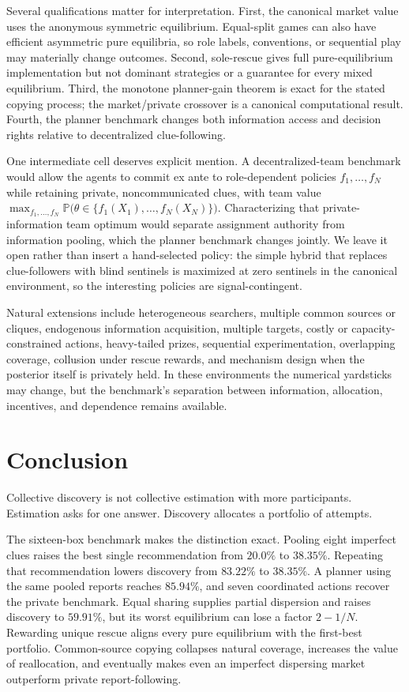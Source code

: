 \documentclass[11pt]{article}
\theoremstyle{definition}
\theoremstyle{remark}
\newcommand{\Prob}{\mathbb{P}}
\newcommand{\1}{\mathbf{1}}
\begin{document}
Several qualifications matter for interpretation. First, the canonical market value uses the anonymous symmetric equilibrium. Equal-split games can also have efficient asymmetric pure equilibria, so role labels, conventions, or sequential play may materially change outcomes. Second, sole-rescue gives full pure-equilibrium implementation but not dominant strategies or a guarantee for every mixed equilibrium. Third, the monotone planner-gain theorem is exact for the stated copying process; the market/private crossover is a canonical computational result. Fourth, the planner benchmark changes both information access and decision rights relative to decentralized clue-following.

One intermediate cell deserves explicit mention. A decentralized-team benchmark would allow the agents to commit ex ante to role-dependent policies $f_1,\ldots,f_N$ while retaining private, noncommunicated clues, with team value $\max_{f_1,\ldots,f_N}\Prob\bigl(\theta\in\{f_1(X_1),\ldots,f_N(X_N)\}\bigr)$. Characterizing that private-information team optimum would separate assignment authority from information pooling, which the planner benchmark changes jointly. We leave it open rather than insert a hand-selected policy: the simple hybrid that replaces clue-followers with blind sentinels is maximized at zero sentinels in the canonical environment, so the interesting policies are signal-contingent.

Natural extensions include heterogeneous searchers, multiple common sources or cliques, endogenous information acquisition, multiple targets, costly or capacity-constrained actions, heavy-tailed prizes, sequential experimentation, overlapping coverage, collusion under rescue rewards, and mechanism design when the posterior itself is privately held. In these environments the numerical yardsticks may change, but the benchmark's separation between information, allocation, incentives, and dependence remains available.

\section{Conclusion}

Collective discovery is not collective estimation with more participants. Estimation asks for one answer. Discovery allocates a portfolio of attempts.

The sixteen-box benchmark makes the distinction exact. Pooling eight imperfect clues raises the best single recommendation from $20.0\%$ to $38.35\%$. Repeating that recommendation lowers discovery from $83.22\%$ to $38.35\%$. A planner using the same pooled reports reaches $85.94\%$, and seven coordinated actions recover the private benchmark. Equal sharing supplies partial dispersion and raises discovery to $59.91\%$, but its worst equilibrium can lose a factor $2-1/N$. Rewarding unique rescue aligns every pure equilibrium with the first-best portfolio. Common-source copying collapses natural coverage, increases the value of reallocation, and eventually makes even an imperfect dispersing market outperform private report-following.
\end{document}
